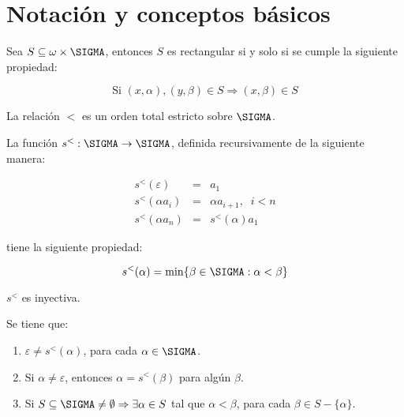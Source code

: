 \section{Notación y conceptos básicos}

  \begin{lemma}
    \par Sea $S \subseteq \omega \times \SIGMA$, entonces $S$ es rectangular si y solo si se cumple la siguiente
    propiedad:

    \[
      \text{Si } (x, \alpha), (y, \beta) \in S \Rightarrow (x, \beta) \in S
    \]
  \end{lemma}

  \begin{lemma}
    \par La relación $<$ es un orden total estricto sobre $\SIGMA$.
  \end{lemma}

  \begin{lemma}
    \par La función $s^{<}: \SIGMA \rightarrow \SIGMA$, definida recursivamente de la siguiente manera:

    \begin{eqnarray}
  		\nonumber s^{<}(\varepsilon) &=& a_{1} \\
  		\nonumber s^{<}(\alpha a_{i}) &=& \alpha a_{i+1}, \;\; i < n \\
  		\nonumber s^{<}(\alpha a_{n}) &=& s^{<}(\alpha) a_{1}
    \end{eqnarray}

    \par tiene la siguiente propiedad:

    \[
      s^{<}(\alpha) = \min \{\beta \in \SIGMA: \alpha < \beta\}
    \]
  \end{lemma}

  \begin{corollary}
    \par $s^{<}$ es inyectiva.
  \end{corollary}

  \begin{lemma}
    \par Se tiene que:

    \begin{enumerate}
      \item $\varepsilon \neq s^{<}(\alpha)$, para cada $\alpha \in \SIGMA$.
      \item Si $\alpha \neq \varepsilon$, entonces $\alpha = s^{<}(\beta)$ para algún $\beta$.
      \item Si $S\subseteq \SIGMA \neq \emptyset \Rightarrow \exists \alpha \in S$ tal que $\alpha < \beta$, para cada
      $\beta \in S-\{\alpha\}$.
    \end{enumerate}
  \end{lemma}


